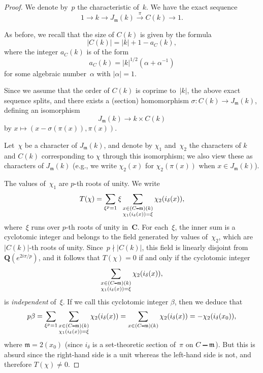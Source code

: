 \documentclass[10pt,a4paper]{amsart}
\newcommand{\Cc}{\mathbf{C}}
\newcommand{\Qq}{\mathbf{Q}}
\newcommand{\fleche}[1]{\stackrel{#1}{\lra}}
\newcommand{\lra}{\longrightarrow}
\newcommand{\mfm}{\mathfrak{m}}
\def\setminus{\mathchoice
    {\mathbin{\vrule height .62ex width 1.61ex depth -.38ex}}%
    {\mathbin{\vrule height .62ex width 1.61ex depth -.38ex}}%
    {\mathbin{\vrule height .50ex width 0.85ex depth -.28ex}}%
    {\mathbin{\vrule height .20ex width 0.570ex depth -.24ex}}%
}
\begin{document}
\begin{proof}
  We denote by~$p$ the characteristic of~$k$. We have the exact sequence
  \[
    1\to k\to J_{\mfm}(k)\fleche{\pi} C(k)\to 1.
  \]

  As before, we recall that the size of $C(k)$ is given by the formula
  \[
    |C(k)|=|k|+1-a_C(k),
  \]
  where the integer $a_C(k)$ is of the form
  \[
    a_C(k)=|k|^{1/2}(\alpha+\alpha^{-1})
  \]
  for some algebraic number~$\alpha$ with $|\alpha|=1$.
  
  Since we assume that the order of $C(k)$ is coprime to~$|k|$, the
  above exact sequence splits, and there exists a (section) homomorphism
  $\sigma\colon C(k)\to J_{\mfm}(k)$, defining an isomorphism
  \[
    J_{\mfm}(k)\to k\times C(k)
  \]
  by $x\mapsto (x-\sigma(\pi(x)),\pi(x))$.

  Let~$\chi$ be a character of $J_{\mfm}(k)$, and denote by $\chi_1$
  and~$\chi_2$ the characters of $k$ and $C(k)$ corresponding to $\chi$
  through this isomorphism; we also view these as characters of
  $J_{\mfm}(k)$ (e.g., we write $\chi_2(x)$ for $\chi_2(\pi(x))$ when
  $x\in J_{\mfm}(k)$).

  The values of~$\chi_1$ are $p$-th roots of unity. We write
  \[
    T(\chi)=\sum_{\xi^p=1}\xi\sum_{\substack{x\in (C\setminus
        \mfm)(k)\\\chi_1(i_{\delta}(x))=\xi}}\chi_2(i_{\delta}(x)),
  \]
  where~$\xi$ runs over $p$-th roots of unity in~$\Cc$. For each~$\xi$,
  the inner sum is a cyclotomic integer and belongs to the field
  generated by values of~$\chi_2$, which are $|C(k)|$-th roots of unity.
  Since~$p\nmid |C(k)|$, this field is linearly disjoint from
  $\Qq(e^{2i\pi/p})$, and it follows that $T(\chi)=0$ if and only if the
  cyclotomic integer
  \[
    \sum_{\substack{x\in (C\setminus
        \mfm)(k)\\\chi_1(i_{\delta}(x))=\xi}}\chi_2(i_{\delta}(x)),
  \]
  is \emph{independent} of~$\xi$. If we call this cyclotomic integer
  $\beta$, then we deduce that
  \[
    p\beta=\sum_{\xi^p=1} \sum_{\substack{x\in (C\setminus
        \mfm)(k)\\\chi_1(i_{\delta}(x))=\xi}}\chi_2(i_{\delta}(x))=
    \sum_{x\in (C\setminus
      \mfm)(k)}\chi_2(i_{\delta}(x))=-\chi_2(i_{\delta}(x_0)),
  \]
  where $\mfm=2(x_0)$ (since $i_{\delta}$ is a set-theoretic section
  of~$\pi$ on $C\setminus \mfm$). But this is absurd since the
  right-hand side is a unit whereas the left-hand side is not, and
  therefore $T(\chi)\not=0$.
\end{proof}
\end{document}
